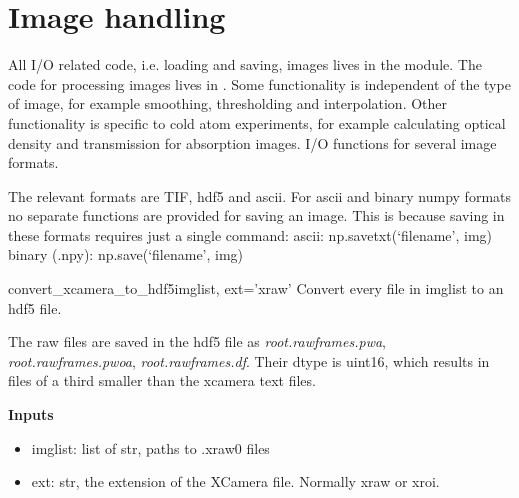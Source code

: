 \documentclass[letterpaper,10pt,english]{manual}
\begin{document}
\resetcurrentobjects
\hypertarget{--doc-imageprocess}{}

\section{Image handling}

All I/O related code, i.e. loading and saving, images lives in the  module. The code for processing images lives in . Some functionality is independent of the type of image, for example smoothing, thresholding and interpolation. Other functionality is specific to cold atom experiments, for example calculating optical density and transmission for absorption images.
\hypertarget{module-odysseus.imageio}{}
\modulesynopsis{}
I/O functions for several image formats.

The relevant formats are TIF, hdf5 and ascii. For ascii and binary numpy formats
no separate functions are provided for saving an image. This is because saving
in these formats requires just a single command:
ascii: np.savetxt(`filename', img)
binary (.npy): np.save(`filename', img)

\hypertarget{odysseus.imageio.convert_xcamera_to_hdf5}{}\begin{funcdesc}{convert\_xcamera\_to\_hdf5}{imglist, ext='xraw'}
Convert every file in imglist to an hdf5 file.

The raw files are saved in the hdf5 file as
\emph{root.rawframes.pwa}, \emph{root.rawframes.pwoa}, \emph{root.rawframes.df}.
Their dtype is uint16, which results in files of a third smaller than
the xcamera text files.

\textbf{Inputs}
\begin{itemize}
\item {} 
imglist: list of str, paths to .xraw0 files

\item {} 
ext: str, the extension of the XCamera file. Normally xraw or xroi.

\end{itemize}
\end{funcdesc}
\end{document}
